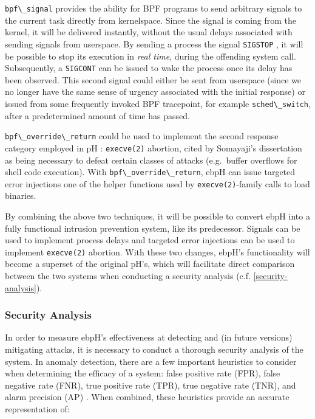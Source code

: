 \documentclass[
  12pt]{findlay}
\newcommand{\passthrough}[1]{#1}
\begin{document}
\passthrough{\lstinline!bpf\_signal!} provides the ability for BPF
programs to send arbitrary signals to the current task directly from
kernelspace. Since the signal is coming from the kernel, it will be
delivered instantly, without the usual delays associated with sending
signals from userspace. By sending a process the signal
\passthrough{\lstinline!SIGSTOP!} \autocite{man_signal}, it will be
possible to stop its execution in \emph{real time}, during the offending
system call. Subsequently, a \passthrough{\lstinline!SIGCONT!}
\autocite{man_signal} can be issued to wake the process once its delay
has been observed. This second signal could either be sent from
userspace (since we no longer have the same sense of urgency associated
with the initial response) or issued from some frequently invoked BPF
tracepoint, for example \passthrough{\lstinline!sched\_switch!}, after a
predetermined amount of time has passed.

\passthrough{\lstinline!bpf\_override\_return!} could be used to
implement the second response category employed in pH \autocite{soma02}:
\passthrough{\lstinline!execve(2)!} abortion, cited by Somayaji's
dissertation as being necessary to defeat certain classes of attacks
(e.g.~buffer overflows for shell code execution). With
\passthrough{\lstinline!bpf\_override\_return!}, ebpH can issue targeted
error injections one of the helper functions used by
\passthrough{\lstinline!execve(2)!}-family calls to load binaries.

By combining the above two techniques, it will be possible to convert
ebpH into a fully functional intrusion prevention system, like its
predecessor. Signals can be used to implement process delays and
targeted error injections can be used to implement
\passthrough{\lstinline!execve(2)!} abortion. With these two changes,
ebpH's functionality will become a superset of the original pH's, which
will facilitate direct comparison between the two systems when
conducting a security analysis (c.f. \autoref{security-analysis}).

\hypertarget{security-analysis}{%
\subsubsection{Security Analysis}\label{security-analysis}}

\label{security_analysis_section}

In order to measure ebpH's effectiveness at detecting and (in future
versions) mitigating attacks, it is necessary to conduct a thorough
security analysis of the system. In anomaly detection, there are a few
important heuristics to consider when determining the efficacy of a
system: false positive rate (FPR), false negative rate (FNR), true
positive rate (TPR), true negative rate (TNR), and alarm precision (AP)
\autocite{vanoorschot19}. When combined, these heuristics provide an
accurate representation of:
\end{document}
